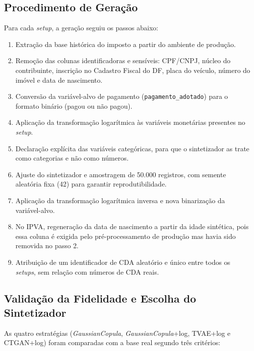 \subsection{Procedimento de Geração}

Para cada \textit{setup}, a geração seguiu os passos abaixo:

\begin{enumerate}
    \item Extração da base histórica do imposto a partir do ambiente de produção.
    \item Remoção das colunas identificadoras e sensíveis: CPF/CNPJ, núcleo do contribuinte, inscrição no Cadastro Fiscal do DF, placa do veículo, número do imóvel e data de nascimento.
    \item Conversão da variável-alvo de pagamento (\texttt{pagamento\_adotado}) para o formato binário (pagou ou não pagou).
    \item Aplicação da transformação logarítmica às variáveis monetárias presentes no \textit{setup}.
    \item Declaração explícita das variáveis categóricas, para que o sintetizador as trate como categorias e não como números.
    \item Ajuste do sintetizador e amostragem de 50.000 registros, com semente aleatória fixa (42) para garantir reprodutibilidade.
    \item Aplicação da transformação logarítmica inversa e nova binarização da variável-alvo.
    \item No IPVA, regeneração da data de nascimento a partir da idade sintética, pois essa coluna é exigida pelo pré-processamento de produção mas havia sido removida no passo 2.
    \item Atribuição de um identificador de CDA aleatório e único entre todos os \textit{setups}, sem relação com números de CDA reais.
\end{enumerate}

\subsection{Validação da Fidelidade e Escolha do Sintetizador}

As quatro estratégias (\textit{GaussianCopula}, \textit{GaussianCopula}+log, TVAE+log e CTGAN+log) foram comparadas com a base real segundo três critérios:

